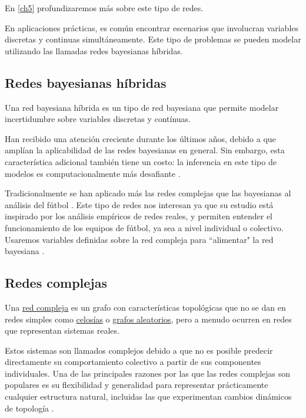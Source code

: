 En \ref{ch5} profundizaremos más sobre este tipo de redes.

En aplicaciones prácticas, es común encontrar escenarios que
involucran variables discretas y continuas simultáneamente. Este tipo de problemas se pueden modelar 
utilizando las llamadas redes bayesianas híbridas.

\subsection{Redes bayesianas híbridas}
\begin{definicion} \label{def:hybrid_BN}
    Una red bayesiana híbrida \cite{hybrid-BN} es un tipo de red bayesiana que permite modelar incertidumbre
    sobre variables discretas y contínuas.
\end{definicion}

Han recibido una atención creciente durante 
los últimos años, debido a que amplían la aplicabilidad de las redes bayesianas en general. Sin embargo, 
esta característica adicional también tiene un costo: la inferencia
en este tipo de modelos es computacionalmente más desafiante \cite{inference-rev-hbn}.

Tradicionalmente se han aplicado más las redes complejas que las bayesianas al análisis del fútbol \cite{ARRIAZAARDILES2018236}.
Este tipo de redes nos interesan ya que su estudio está inspirado por los análisis empíricos de redes reales, y 
permiten entender el funcionamiento de los equipos de fútbol, ya sea a nivel individual o colectivo. Usaremos 
variables definidas sobre la red compleja para ``alimentar" la red bayesiana \cite{Bai_Xing_Wu_2022}.

\subsection{Redes complejas}
\begin{definicion} \label{def:CN}
    Una \href{https://en.wikipedia.org/wiki/Complex_network}{red compleja} 
    es un grafo con características topológicas que no se dan 
    en redes simples como \href{https://en.wikipedia.org/wiki/Lattice_(order)}{celosías} o 
    \href{https://mathworld.wolfram.com/RandomGraph.html}{grafos aleatorios}, pero a menudo ocurren en redes que 
    representan sistemas reales. 
\end{definicion}

Estos sistemas son llamados complejos debido a que no es posible predecir directamente su 
comportamiento colectivo a partir de sus componentes individuales. Una de las principales razones por las que 
las redes complejas son populares es su flexibilidad
y generalidad para representar prácticamente cualquier estructura natural, incluidas las que experimentan 
cambios dinámicos de topología \cite{CN-review}.


